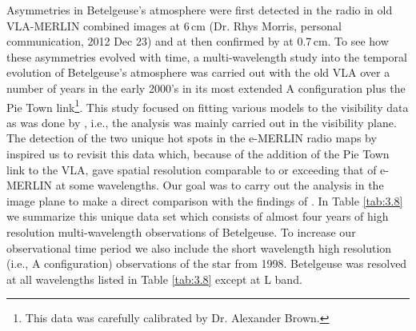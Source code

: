 Asymmetries in Betelgeuse's atmosphere were first detected in the radio in old VLA-MERLIN combined images at 6\,cm (Dr. Rhys Morris, personal communication, 2012 Dec 23) and at then confirmed by \cite{lim_1998} at 0.7\,cm. To see how these asymmetries evolved with time, a multi-wavelength study into the temporal evolution of Betelgeuse's atmosphere was carried out with the old VLA over a number of years in the early 2000's in its most extended A configuration plus the Pie Town link\footnote{This data was carefully calibrated by Dr. Alexander Brown.}. This study focused on fitting various models to the visibility data as was done by \cite{lim_1998}, i.e., the analysis was mainly carried out in the visibility plane. The detection of the two unique hot spots in the e-MERLIN radio maps by \cite{richards_2013} inspired us to revisit this data which, because of the addition of the Pie Town link to the VLA, gave spatial resolution comparable to or exceeding that of e-MERLIN at some wavelengths. Our goal was to carry out the analysis in the image plane to make a direct comparison with the findings of \cite{richards_2013}. In Table \ref{tab:3.8} we summarize this unique data set which consists of almost four years of high resolution multi-wavelength  observations of Betelgeuse. To increase our observational time period we also include the short wavelength high resolution (i.e., A configuration) observations of the star from 1998. Betelgeuse was resolved at all wavelengths listed in Table \ref{tab:3.8} except at L band.
